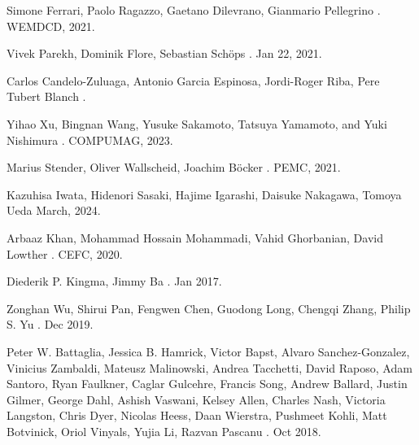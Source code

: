 \documentclass{report} %
\begin{document}
\begin{thebibliography}{00}
    \newblock Simone Ferrari, Paolo Ragazzo, Gaetano Dilevrano, Gianmario Pellegrino
    .
    \newblock WEMDCD, 2021.

    \newblock Vivek Parekh, Dominik Flore, Sebastian Schöps
    .
    \newblock Jan 22, 2021.

    \newblock Carlos Candelo-Zuluaga, Antonio Garcia Espinosa, Jordi-Roger Riba, Pere Tubert Blanch
    .
    
    \newblock Yihao Xu, Bingnan Wang, Yusuke Sakamoto, Tatsuya Yamamoto, and Yuki Nishimura
    .
    \newblock COMPUMAG, 2023.

    \newblock Marius Stender, Oliver Wallscheid, Joachim Böcker
    .
    \newblock PEMC, 2021.

    \newblock Kazuhisa Iwata, Hidenori Sasaki, Hajime Igarashi, Daisuke Nakagawa, Tomoya Ueda
     March, 2024.
    
    \newblock Arbaaz Khan, Mohammad Hossain Mohammadi, Vahid Ghorbanian, David Lowther
    .
    \newblock CEFC, 2020.

    \newblock Diederik P. Kingma, Jimmy Ba
    .
     Jan 2017.

    \newblock Zonghan Wu, Shirui Pan, Fengwen Chen, Guodong Long, Chengqi Zhang, Philip S. Yu
    .
     Dec 2019.

    \newblock Peter W. Battaglia, Jessica B. Hamrick, Victor Bapst, Alvaro Sanchez-Gonzalez, Vinicius Zambaldi, Mateusz Malinowski, Andrea Tacchetti, David Raposo, 
    Adam Santoro, Ryan Faulkner, Caglar Gulcehre, Francis Song, Andrew Ballard, Justin Gilmer, George Dahl, Ashish Vaswani, Kelsey Allen, Charles Nash,
    Victoria Langston, Chris Dyer, Nicolas Heess, Daan Wierstra, Pushmeet Kohli, Matt Botvinick, Oriol Vinyals, Yujia Li, Razvan Pascanu
    .
     Oct 2018.


\end{thebibliography}
\end{document}
